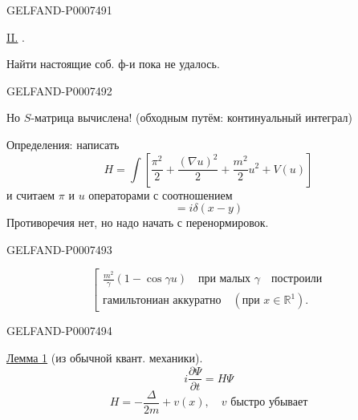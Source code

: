\begin{GelfandAdjacentEvidence}{GELFAND-P000749}{1}

\underline{II.} .

Найти настоящие соб. ф-и пока не удалось.
\end{GelfandAdjacentEvidence}
\begin{GelfandAdjacentEvidence}{GELFAND-P000749}{2}

 Но \(S\)-матрица вычислена! (обходным путём: континуальный интеграл)

Определения: написать
\begin{equation*}
H=\int\left[\frac{\pi^2}{2}+\frac{(\nabla u)^2}{2}+\frac{m^2}{2}u^2+V(u)\right]
\tag{25}
\end{equation*}
и считаем \(\pi\) и \(u\) операторами с соотношением
\begin{equation*}
[\hat\pi(x),\hat u(y)]=i\delta(x-y)
\tag{26}
\end{equation*}
Противоречия нет, но надо начать с перенормировок.


\end{GelfandAdjacentEvidence}
\begin{GelfandAdjacentEvidence}{GELFAND-P000749}{3}

\[
\left[\begin{gathered}
\frac{m^2}{\gamma}(1-\cos\gamma u)\quad\text{при малых }\gamma\quad\text{построили}\\
\text{гамильтониан аккуратно}\quad(\text{при }x\in\mathbb R^1).
\end{gathered}\right.
\]
\end{GelfandAdjacentEvidence}
\begin{GelfandAdjacentEvidence}{GELFAND-P000749}{4}


\underline{Лемма 1} (из обычной квант. механики). 
\begin{equation*}
i\frac{\partial\Psi}{\partial t}=H\Psi
\tag{27}
\end{equation*}
\begin{equation*}
H=-\frac{\Delta}{2m}+v(x),\quad v\text{ быстро убывает}
\tag{28}
\end{equation*}
\end{GelfandAdjacentEvidence}


